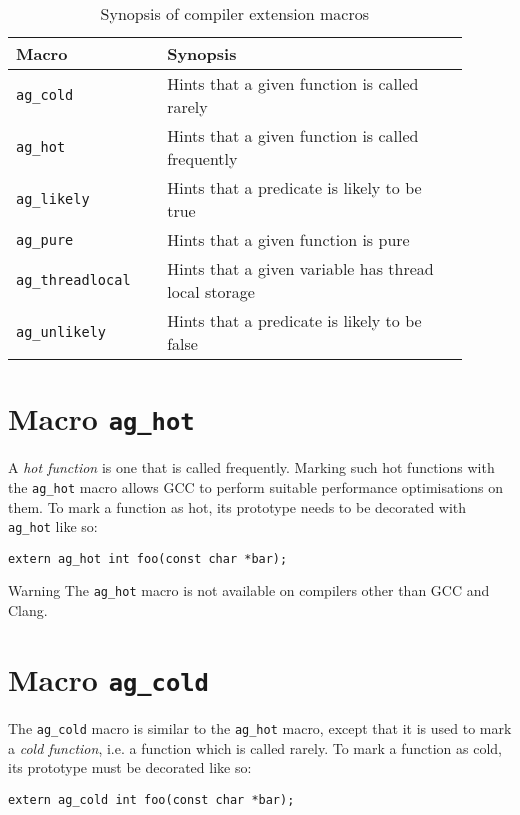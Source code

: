 \renewcommand\arraystretch{1.1}
\begin{table}[!htbp]
\centering
\small
\begin{tabular}[t]{>{\centering}m{0.3\linewidth}
    >{\raggedright\arraybackslash}m{0.6\linewidth}}
\toprule
\textbf{Macro} & \textbf{Synopsis} \\
\midrule
\texttt{ag\_cold} & Hints that a given function is called rarely \\
\texttt{ag\_hot} & Hints that a given function is called frequently \\
\texttt{ag\_likely} & Hints that a predicate is likely to be true \\
\texttt{ag\_pure} & Hints that a given function is pure \\
\texttt{ag\_threadlocal} & Hints that a given variable has thread local 
    storage \\
\texttt{ag\_unlikely} & Hints that a predicate is likely to be false \\
\bottomrule
\end{tabular}
\caption{Synopsis of compiler extension macros}
\label{tab:synopsis}
\end{table}


\section{Macro \texttt{ag\_hot}}
A \emph{hot function} is one that is called frequently. Marking such hot
functions with the \verb|ag_hot| macro allows GCC to perform suitable
performance optimisations on them. To mark a function as hot, its prototype
needs to be decorated with \verb|ag_hot| like so:
\begin{lstlisting}[linewidth=1.0\linewidth]
extern ag_hot int foo(const char *bar);
\end{lstlisting}

\begin{bclogo}[logo=\bctakecare, noborder=true, couleurBarre=orange]{Warning}
  The \verb|ag_hot| macro is not available on compilers other than GCC and 
  Clang.
\end{bclogo}


\section{Macro \texttt{ag\_cold}}
The \verb|ag_cold| macro is similar to the \verb|ag_hot| macro, except
that it is used to mark a \emph{cold function}, i.e. a function which is called
rarely. To mark a function as cold, its prototype must be decorated like so:
\begin{lstlisting}[linewidth=1.0\linewidth]
extern ag_cold int foo(const char *bar);
\end{lstlisting}


